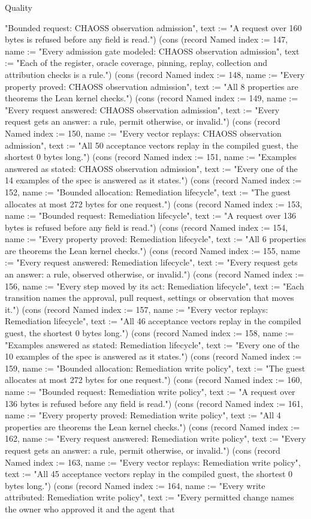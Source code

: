 \begin{lexlean}{Quality}
\begin{semanticmodule}
{"Bounded request: CHAOSS observation admission", text := "A request over 160 bytes is refused before any field is read."}) (cons (record Named {index := 147, name := "Every admission gate modeled: CHAOSS observation admission", text := "Each of the register, oracle coverage, pinning, replay, collection and attribution checks is a rule."}) (cons (record Named {index := 148, name := "Every property proved: CHAOSS observation admission", text := "All 8 properties are theorems the Lean kernel checks."}) (cons (record Named {index := 149, name := "Every request answered: CHAOSS observation admission", text := "Every request gets an answer: a rule, permit otherwise, or invalid."}) (cons (record Named {index := 150, name := "Every vector replays: CHAOSS observation admission", text := "All 50 acceptance vectors replay in the compiled guest, the shortest 0 bytes long."}) (cons (record Named {index := 151, name := "Examples answered as stated: CHAOSS observation admission", text := "Every one of the 14 examples of the spec is answered as it states."}) (cons (record Named {index := 152, name := "Bounded allocation: Remediation lifecycle", text := "The guest allocates at most 272 bytes for one request."}) (cons (record Named {index := 153, name := "Bounded request: Remediation lifecycle", text := "A request over 136 bytes is refused before any field is read."}) (cons (record Named {index := 154, name := "Every property proved: Remediation lifecycle", text := "All 6 properties are theorems the Lean kernel checks."}) (cons (record Named {index := 155, name := "Every request answered: Remediation lifecycle", text := "Every request gets an answer: a rule, observed otherwise, or invalid."}) (cons (record Named {index := 156, name := "Every step moved by its act: Remediation lifecycle", text := "Each transition names the approval, pull request, settings or observation that moves it."}) (cons (record Named {index := 157, name := "Every vector replays: Remediation lifecycle", text := "All 46 acceptance vectors replay in the compiled guest, the shortest 0 bytes long."}) (cons (record Named {index := 158, name := "Examples answered as stated: Remediation lifecycle", text := "Every one of the 10 examples of the spec is answered as it states."}) (cons (record Named {index := 159, name := "Bounded allocation: Remediation write policy", text := "The guest allocates at most 272 bytes for one request."}) (cons (record Named {index := 160, name := "Bounded request: Remediation write policy", text := "A request over 136 bytes is refused before any field is read."}) (cons (record Named {index := 161, name := "Every property proved: Remediation write policy", text := "All 4 properties are theorems the Lean kernel checks."}) (cons (record Named {index := 162, name := "Every request answered: Remediation write policy", text := "Every request gets an answer: a rule, permit otherwise, or invalid."}) (cons (record Named {index := 163, name := "Every vector replays: Remediation write policy", text := "All 45 acceptance vectors replay in the compiled guest, the shortest 0 bytes long."}) (cons (record Named {index := 164, name := "Every write attributed: Remediation write policy", text := "Every permitted change names the owner who approved it and the agent that }
\end{semanticmodule}
\end{lexlean}
